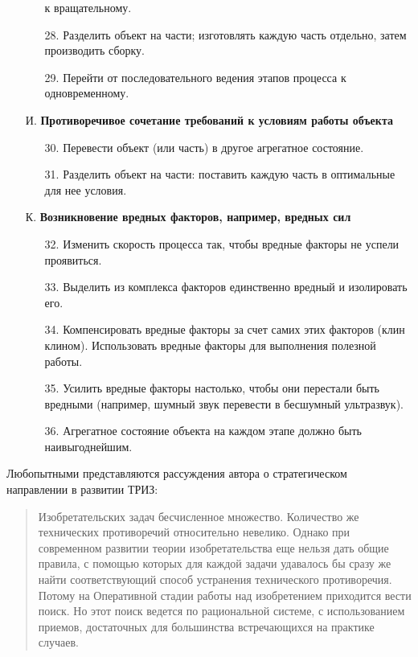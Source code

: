 \documentclass[11pt,a4paper]{article}
\begin{document}
\begin{itemize}
\begin{itemize}
    к вращательному.
  \item[28.] Разделить объект на части; изготовлять каждую часть отдельно,
    затем производить сборку.
  \item[29.] Перейти от последовательного ведения этапов процесса к
    одновременному.
  \end{itemize}
\item[И.] \textbf{Противоречивое сочетание требований к условиям работы
  объекта}
  \begin{itemize}
  \item[30.] Перевести объект (или часть) в другое агрегатное состояние.
  \item[31.] Разделить объект на части: поставить каждую часть в оптимальные
    для нее условия.
  \end{itemize}
\item[К.] \textbf{Возникновение вредных факторов, например, вредных сил}
  \begin{itemize}
  \item[32.] Изменить скорость процесса так, чтобы вредные факторы не успели
    проявиться.
  \item[33.] Выделить из комплекса факторов единственно вредный и изолировать
    его.
  \item[34.] Компенсировать вредные факторы за счет самих этих факторов (клин
    клином). Использовать вредные факторы для выполнения полезной работы.
  \item[35.] Усилить вредные факторы настолько, чтобы они перестали быть
    вредными (например, шумный звук перевести в бесшумный ультразвук).
  \item[36.] Агрегатное состояние объекта на каждом этапе должно быть
    наивыгоднейшим.
  \end{itemize}
\end{itemize}
Любопытными представляются рассуждения автора о стратегическом направлении в
развитии ТРИЗ:
\begin{quote}
  Изобретательских задач бесчисленное множество. Количество же технических
  противоречий относительно невелико. Однако при современном развитии теории
  изобретательства еще нельзя дать общие правила, с помощью которых для каждой
  задачи удавалось бы сразу же найти соответствующий способ устранения
  технического противоречия. Потому на Оперативной стадии работы над
  изобретением приходится вести поиск. Но этот поиск ведется по рациональной
  системе, с использованием приемов, достаточных для большинства встречающихся
  на практике случаев.
\end{quote}
\end{document}
